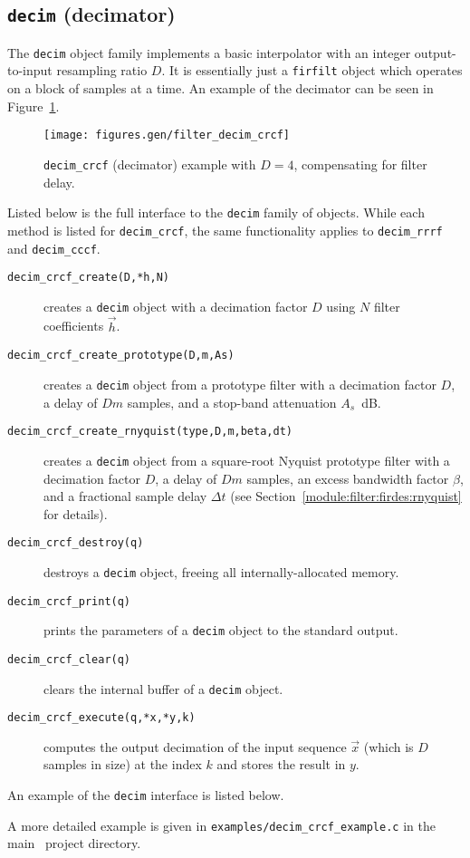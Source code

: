 \subsection{{\tt decim} (decimator)}
\label{module:filter:decim}
The {\tt decim} object family implements a basic interpolator with an
integer output-to-input resampling ratio $D$.
It is essentially just a {\tt firfilt} object which operates on a block
of samples at a time.
An example of the decimator can be seen in
Figure~\ref{fig:module:filter:decim_crcf}.
%
\begin{figure}
\centering
  \texttt{[image: figures.gen/filter\_decim\_crcf]}
\caption{{\tt decim\_crcf} (decimator) example with $D=4$,
         compensating for filter delay.}
\label{fig:module:filter:decim_crcf}
\end{figure}
%
Listed below is the full interface to the {\tt decim} family of
objects.
While each method is listed for {\tt decim\_crcf}, the same
functionality applies to {\tt decim\_rrrf} and {\tt decim\_cccf}.
%
\begin{description}
\item[{\tt decim\_crcf\_create(D,*h,N)}]
    creates a {\tt decim} object with a decimation factor $D$ using $N$
    filter coefficients $\vec{h}$.
\item[{\tt decim\_crcf\_create\_prototype(D,m,As)}]
    creates a {\tt decim} object from a prototype filter with a
    decimation factor $D$,
    a delay of $Dm$ samples, and
    a stop-band attenuation $A_s$~dB.
\item[{\tt decim\_crcf\_create\_rnyquist(type,D,m,beta,dt)}]
    creates a {\tt decim} object from a square-root Nyquist prototype filter with a
    decimation factor $D$,
    a delay of $Dm$ samples,
    an excess bandwidth factor $\beta$, and
    a fractional sample delay $\Delta t$
    (see Section~\ref{module:filter:firdes:rnyquist} for details).
\item[{\tt decim\_crcf\_destroy(q)}]
    destroys a {\tt decim} object, freeing all internally-allocated
    memory.
\item[{\tt decim\_crcf\_print(q)}]
    prints the parameters of a {\tt decim} object to the standard
    output.
\item[{\tt decim\_crcf\_clear(q)}]
    clears the internal buffer of a {\tt decim} object.
\item[{\tt decim\_crcf\_execute(q,*x,*y,k)}]
    computes the output decimation of the input sequence $\vec{x}$
    (which is $D$ samples in size) at the index $k$ and stores the
    result in $y$.
\end{description}
%
An example of the {\tt decim} interface is listed below.
%

%
A more detailed example is given in
{\tt examples/decim\_crcf\_example.c}
in the main \liquid\ project directory.


